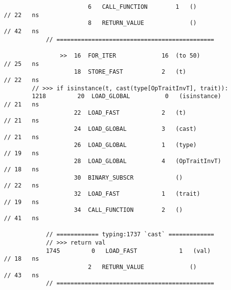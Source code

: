 \begin{code}
\begin{verbatim}
                        6   CALL_FUNCTION        1   ()                                     // 22   ns
                        8   RETURN_VALUE             ()                                     // 42   ns
            // =============================================

                >>  16  FOR_ITER             16  (to 50)                                    // 25   ns
                    18  STORE_FAST           2   (t)                                        // 22   ns
        // >>> if isinstance(t, cast(type[OpTraitInvT], trait)):
        1218         20  LOAD_GLOBAL          0   (isinstance)                              // 21   ns
                    22  LOAD_FAST            2   (t)                                        // 21   ns
                    24  LOAD_GLOBAL          3   (cast)                                     // 21   ns
                    26  LOAD_GLOBAL          1   (type)                                     // 19   ns
                    28  LOAD_GLOBAL          4   (OpTraitInvT)                              // 18   ns
                    30  BINARY_SUBSCR            ()                                         // 22   ns
                    32  LOAD_FAST            1   (trait)                                    // 19   ns
                    34  CALL_FUNCTION        2   ()                                         // 41   ns

            // ============ typing:1737 `cast` =============
            // >>> return val
            1745         0   LOAD_FAST            1   (val)                                 // 18   ns
                        2   RETURN_VALUE             ()                                     // 43   ns
            // =============================================


\end{verbatim}
\end{code}
